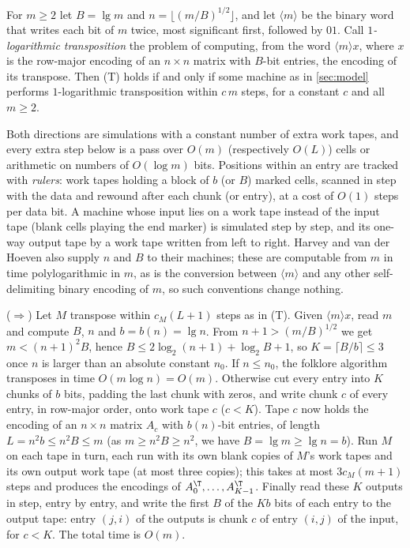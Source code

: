 \begin{proposition}\label{prop:entry-width}
\notformalized
For $m\ge2$ let $B=\lg m$ and $n=\lfloor(m/B)^{1/2}\rfloor$, and let $\langle m\rangle$ be the binary word that writes each bit of $m$ twice, most significant first, followed by $01$. Call \emph{$1$-logarithmic transposition} the problem of computing, from the word $\langle m\rangle x$, where $x$ is the row-major encoding of an $n\times n$ matrix with $B$-bit entries, the encoding of its transpose. Then (T) holds if and only if some machine as in \cref{sec:model} performs $1$-logarithmic transposition within $c\,m$ steps, for a constant $c$ and all $m\ge2$.
\end{proposition}

\begin{informalproof}
Both directions are simulations with a constant number of extra work tapes, and every extra step below is a
pass over $O(m)$ (respectively $O(L)$) cells or arithmetic on numbers of $O(\log m)$ bits. Positions within an entry are tracked with \emph{rulers}: work tapes holding a block of $b$ (or $B$) marked cells, scanned in step with the data and rewound after each chunk (or entry), at a cost of $O(1)$ steps per data bit. A machine whose input lies on a
work tape instead of the input tape (blank cells playing the end marker) is simulated step by step, and its
one-way output tape by a work tape written from left to right. Harvey and van der Hoeven also supply $n$ and $B$ to their machines; these are computable from $m$ in time polylogarithmic in $m$, as is the conversion between $\langle m\rangle$ and any other self-delimiting binary encoding of $m$, so such conventions change nothing.

($\Rightarrow$) Let $M$ transpose within $c_M(L+1)$ steps as in (T). Given $\langle m\rangle x$, read $m$ and compute $B$, $n$ and $b=b(n)=\lg n$. From $n+1>(m/B)^{1/2}$ we get $m<(n+1)^2B$, hence $B\le2\log_2(n+1)+\log_2B+1$,
so $K=\lceil B/b\rceil\le3$ once $n$ is larger than an absolute constant $n_0$. If $n\le n_0$, the folklore
algorithm transposes in time $O(m\log n)=O(m)$. Otherwise cut every entry into $K$ chunks of $b$ bits,
padding the last chunk with zeros, and write chunk $c$ of every entry, in row-major order, onto work tape $c$ ($c<K$). Tape $c$ now holds the encoding of an $n\times n$ matrix $A_c$ with $b(n)$-bit entries, of length $L=n^2b\le n^2B\le m$ (as $m\ge n^2B\ge n^2$, we have $B=\lg m\ge\lg n=b$). Run $M$ on each tape in turn, each run with its own blank copies of $M$'s work tapes and its own output work tape (at most three copies); this takes at most $3c_M(m+1)$ steps and produces the encodings of $A_0^{\T},\dots,A_{K-1}^{\T}$. Finally read these $K$ outputs in step, entry by entry, and write the first $B$ of the $Kb$ bits of each entry to the output tape: entry $(j,i)$ of the outputs is chunk $c$ of entry $(i,j)$ of the input, for $c<K$. The total time is $O(m)$.


\end{informalproof}
